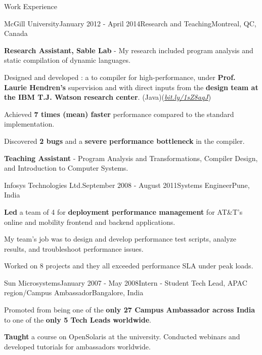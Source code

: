 \documentclass{resume} %
\begin{document}
\begin{rSection}{Work Experience}
\begin{rSubsection}{McGill University}{January 2012 - April 2014}{Research and
Teaching}{Montreal, QC, Canada} 
\item \textbf{Research Assistant, Sable Lab} - My research included program
analysis and static compilation of dynamic languages.

\begin{lsubSubsection}
\item Designed and developed \mixtenx: a \matlab to
\xten  compiler for high-performance, under \textbf{Prof.
Laurie Hendren's} supervision and with direct inputs from the \textbf{\xten
design team at the IBM T.J. Watson research
        center}. (Java)(\href{http://bit.ly/1sZ8aqJ}{\em{bit.ly/1sZ8aqJ}})  
 \item Achieved \textbf{7 times (mean) faster} performance compared to the
 standard \matlab implementation.
  \item Discovered \textbf{2 bugs} and a \textbf{severe performance bottleneck}
in the \xten compiler.  
\end{lsubSubsection}
\item \textbf{Teaching Assistant} - Program Analysis and Transformations,
	Compiler Design, and Introduction to Computer Systems.
\end{rSubsection}

\begin{rSubsection}{Infosys Technologies Ltd.}{September 2008 - August
2011}{Systems Engineer}{Pune, India}
\item \textbf{Led} a team of 4 for \textbf{deployment performance management}
	for AT\&T's online and mobility frontend and backend applications.
\begin{lsubSubsection}
\item My team's job was to design and develop performance test scripts, analyze
	results, and troubleshoot performance issues.  
\item {Worked on 8 projects} and they all exceeded performance SLA under peak
	loads.
\end{lsubSubsection}
\end{rSubsection}

\begin{rSubsection}{Sun Microsystems}{January 2007 - May 2008}{Intern - Student
Tech Lead, APAC region/Campus Ambassador}{Bangalore, India}
\item Promoted from being one of the \textbf{only 27 Campus Ambassador across
	India} to one of the \textbf{only 5 Tech Leads worldwide}.  
\begin{lsubSubsection}
\item \textbf{Taught} a course on OpenSolaris at the university. Conducted
	webinars and developed tutorials for ambassadors worldwide.
\end{lsubSubsection}
\end{rSubsection}
\end{rSection}
\end{document}

